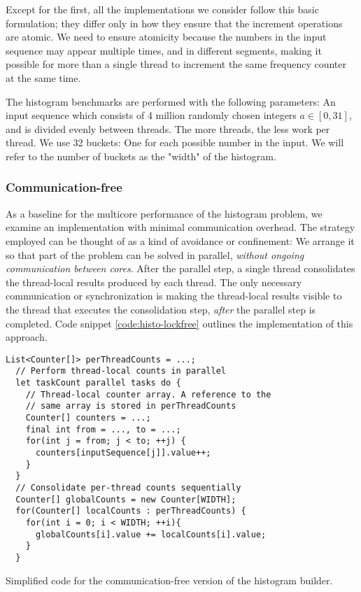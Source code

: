 Except for the first, all the implementations we consider follow this basic formulation; they differ
only in how they ensure that the increment operations are atomic. We need to
ensure atomicity because the numbers in the input sequence may appear multiple
times, and in different segments, making it possible for more than a single
thread to increment the same frequency counter at the same time.

The histogram benchmarks are performed with the following parameters: An input
sequence which consists of 4 million randomly chosen integers $a\in[0,31]$, and
is divided evenly between threads. The more threads, the less work per thread.
We use 32 buckets: One for each possible number in the input. We will refer to
the number of buckets as the "width" of the histogram.

\subsubsection{Communication-free}
As a baseline for the multicore performance of the histogram problem, we examine
an implementation with minimal communication overhead. The strategy employed can
be thought of as a kind of avoidance or confinement: We arrange it so that part
of the problem can be solved in parallel, \textit{without ongoing communication
between cores}. After the parallel step, a single thread consolidates the
thread-local results produced by each thread. The only necessary communication
or synchronization is making the thread-local results visible to the thread that
executes the consolidation step, \textit{after} the parallel step is completed.
Code snippet \ref{code:histo-lockfree} outlines the implementation of this
approach.

\begin{code}
\begin{Verbatim}[frame=single]
  List<Counter[]> perThreadCounts = ...;
  // Perform thread-local counts in parallel
  let taskCount parallel tasks do {
    // Thread-local counter array. A reference to the
    // same array is stored in perThreadCounts
    Counter[] counters = ...;
    final int from = ..., to = ...;
    for(int j = from; j < to; ++j) {
      counters[inputSequence[j]].value++;
    }
  }
  // Consolidate per-thread counts sequentially
  Counter[] globalCounts = new Counter[WIDTH];
  for(Counter[] localCounts : perThreadCounts) {
    for(int i = 0; i < WIDTH; ++i){
      globalCounts[i].value += localCounts[i].value;
    }
  }
\end{Verbatim}
	\caption{Simplified code for the communication-free version of the
	histogram builder.}
	\label{code:histo-lockfree}
\end{code}

